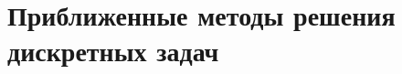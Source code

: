 \documentclass[discrete.tex]{subfiles}
\begin{document}
  \section{Приближенные методы решения дискретных задач}
\end{document}
